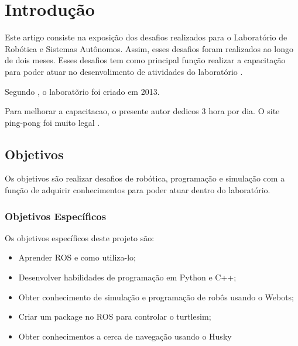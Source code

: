 \chapter{Introdução}
\label{chap:intro}

Este artigo consiste na exposição dos desafios realizados para o Laboratório de Robótica e Sistemas Autônomos. Assim, esses desafios foram realizados ao longo de dois meses. Esses desafios tem como principal função realizar a capacitação para poder atuar no desenvolimento de atividades do laboratório \cite{Barabasi2003-1}.

Segundo , o laboratõrio foi criado em 2013.

Para melhorar a capacitacao, o presente autor dedicos 3 hora por dia. O site ping-pong foi muito legal \cite{CursoPyt77:online}.




\section{Objetivos}
\label{sec:obj}
Os objetivos são realizar desafios de robótica, programação e simulação com a função de adquirir conhecimentos para poder atuar dentro do laboratório.
\label{sec:obj}

\subsection{Objetivos Específicos}
\label{ssec:objesp}
Os objetivos específicos deste projeto são:
\begin{itemize}
      \item Aprender ROS e como utiliza-lo;
      \item Desenvolver habilidades de programação em Python e C++;
      \item Obter conhecimento de simulação e programação de robôs usando o Webots;
      \item Criar um package no ROS para controlar o turtlesim;
      \item Obter conhecimentos a cerca de navegação usando o Husky
  \end{itemize}




